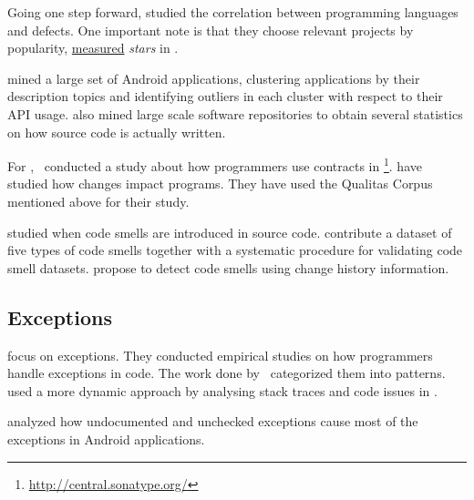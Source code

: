Going one step forward, \cite{rayLargescaleStudyProgramming2017} studied the correlation between programming languages and defects. 
One important note is that they choose relevant projects by popularity,
\underline{measured} \emph{stars} in \github{}.

\cite{gorlaCheckingAppBehavior2014} mined a large set of Android applications, clustering applications by their description topics and identifying outliers in each cluster with respect to their API usage.
\cite{grechanikEmpiricalInvestigationLargescale2010} also mined large scale software repositories to obtain several statistics on how source code is actually written.

For \java{},~\cite{dietrichContractsWildStudy2017a} conducted a study
about how programmers use contracts in \mavencentral{}\footnote{\url{http://central.sonatype.org/}}.
\cite{dietrichBrokenPromisesEmpirical2014} have studied how
\api{} changes impact \java{} programs.
They have used the Qualitas Corpus~\citep{temperoQualitasCorpusCurated2010} mentioned above for their study.

\cite{tufanoWhenWhyYour2015,tufanoWhenWhyYour2017} studied when code smells are introduced in source code.
\cite{palombaLandfillOpenDataset2015}
contribute a dataset of five types of code smells together with a systematic procedure for validating code smell datasets.
\cite{palombaDetectingBadSmells2013} propose to detect code smells using change history information.

\subsection*{Exceptions}

\cite{keryExaminingProgrammerPractices2016,asaduzzamanHowDevelopersUse2016} focus on exceptions.
They conducted empirical studies on how programmers handle exceptions in \java{} code.
The work done by~\cite{nakshatriAnalysisExceptionHandling2016} categorized them into patterns.
\cite{coelhoUnveilingExceptionHandling2015} used a more dynamic approach by analysing stack traces and code issues in \github{}.

\cite{kechagiaUndocumentedUncheckedExceptions2014} analyzed how undocumented and
unchecked exceptions cause most of the exceptions in
Android applications.

